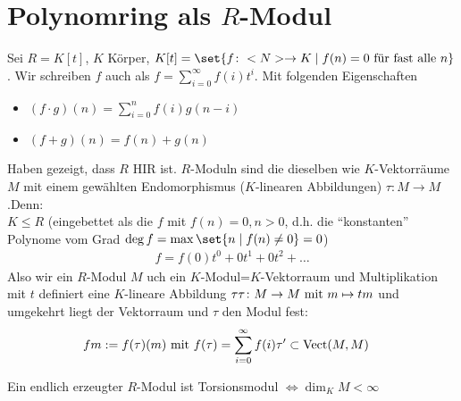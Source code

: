 \section*{Polynomring als $R$-Modul}
\begin{example}
	Sei $R = K[t]$, $K$ Körper, $K[t] = \set{f \colon \N \to K \mid f(n) = 0 \text{ für fast alle }n}$. Wir schreiben $f$ auch als $f = \sum_{i=0}^{\infty} f(i)t^{i}$. Mit folgenden Eigenschaften
	\begin{itemize}
		\item $(f\cdot g)(n) = \sum_{i=0}^n f(i)g(n-i)$
		\item $(f+g)(n) = f(n) + g(n)$
	\end{itemize}
	Haben gezeigt, dass $R$ HIR ist. $R$-Moduln sind die dieselben wie $K$-Vektorräume $M$ mit einem gewählten Endomorphismus ($K$-linearen Abbildungen) $\tau \colon M \to M$.Denn:\\
	$K \le R$ (eingebettet als die $f$ mit $f(n) = 0, n > 0$, d.h. die ``konstanten'' Polynome vom Grad $\deg f = \max\set{n \mid f(n) \neq 0} = 0$)
	\begin{align*}
		f = f(0)t^0 + 0t^1 + 0t^2 + \dots 
	\end{align*} 
	Also wir ein $R$-Modul $M$ uch ein $K$-Modul=$K$-Vektorraum und Multiplikation mit $t$ definiert eine $K$-lineare Abbildung $\tau \tau \colon M \to M \mit m \mapsto tm$ und umgekehrt liegt der Vektorraum und $\tau$ den Modul fest:
	\begin{align*}
		fm &:= f(\tau)(m) \mit f(\tau) = \sum_{i=0}^{\infty}f(i)\tau' \subset \Vect(M,M)
	\end{align*}
\end{example}
\begin{proposition}
	Ein endlich erzeugter $R$-Modul ist Torsionsmodul $\Leftrightarrow \dim_K M < \infty$
\end{proposition}
